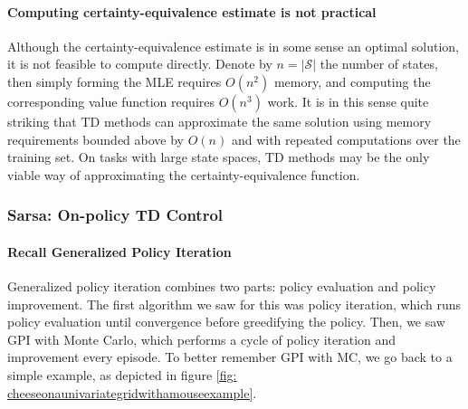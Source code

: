 \documentclass[12pt]{article}
\begin{document}
\paragraph{Computing certainty-equivalence estimate is not practical} Although the certainty-equivalence estimate is in some sense an optimal solution, it is not feasible to compute directly. Denote by $ n = |\mathcal S|$ the number of states, then simply forming the MLE requires $O(n^2)$ memory, and computing the corresponding value function requires $O(n^3)$ work. It is in this sense quite striking that TD methods can approximate the same solution using memory requirements bounded above by $O(n)$ and with repeated computations over the training set. On tasks with large state spaces, TD methods may be the only viable way of approximating the certainty-equivalence function.

\subsubsection{Sarsa: On-policy TD Control}
\paragraph{Recall Generalized Policy Iteration}
Generalized policy iteration combines two parts: policy evaluation and policy improvement. The first algorithm we saw for this was policy iteration, which runs policy evaluation until convergence before greedifying the policy. Then, we saw GPI with Monte Carlo, which performs a cycle of policy iteration and improvement every episode. To better remember GPI with MC, we go back to a simple example, as depicted in figure \ref{fig: cheeseonaunivariategridwithamouseexample}.
\end{document}
